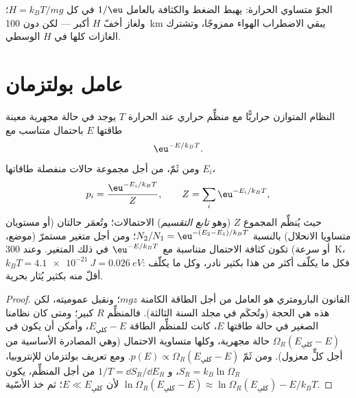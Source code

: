 \begin{omfigure}

{\small الجوّ متساوي الحرارة: يهبط الضغط والكثافة بالعامل $1/\eu$
في كل  $H = k_BT/mg$؛ ولغاز أخفّ $H$ أكبر
--- لكن دون \qty{100}{km} يبقي الاضطراب الهواء ممزوجًا، وتشترك
الغازات كلها في $H$ الوسطي.}
\end{omfigure}

\section{عامل بولتزمان}

\begin{theorem}\label{thm:b2:boltzmann-factor:factor}
النظام المتوازن حراريًّا مع منظِّم حراري عند الحرارة
$T$ يوجد في حالة مجهرية معينة طاقتها $E$ باحتمال
متناسب مع
\[
\eu^{-E/k_BT} .
\]
ومن ثَمّ، من أجل مجموعة حالات منفصلة طاقاتها $E_i$،
\[
p_i = \frac{\eu^{-E_i/k_BT}}{Z}, \qquad Z = \sum_i\eu^{-E_i/k_BT} ,
\]
حيث يُنظِّم المجموع $Z$ (وهو \emph{تابع التقسيم})
الاحتمالات؛ وتُعمَر حالتان (أو مستويان متساويا الانحلال)
بالنسبة $N_2/N_1 = \eu^{-(E_2 - E_1)/k_BT}$؛
ومن أجل متغير مستمرّ (موضع، أو سرعة) تكون كثافة
الاحتمال متناسبة مع $\eu^{-E/k_BT}$ في ذلك المتغير. وعند
\qty{300}{K}، $k_BT = \qty{4.1e-21}{J} = \qty{0.026}{eV}$: فكل ما
يكلّف أكثر من هذا بكثير نادر، وكل ما يكلّف أقلّ منه بكثير
يُثار بحرية.
\end{theorem}

\begin{proof}
القانون البارومتري هو العامل من أجل الطاقة الكامنة $mgz$؛ ونقبل
عموميته، لكن هذه هي الحجة (وتُحكَم في مجلد
السنة الثالثة). فالمنظِّم $R$ كبير؛ ومتى كان نظامنا الصغير في
حالة طاقتها $E$، كانت للمنظِّم الطاقة $E_{\text{كلي}} -
E$، وأمكن أن يكون في $\Omega_R(E_{\text{كلي}} - E)$ حالة مجهرية، وكلها
متساوية الاحتمال (وهي المصادرة الأساسية من أجل كلٍّ معزول). ومن ثَمّ
$p(E) \propto \Omega_R(E_{\text{كلي}} - E)$. ومع تعريف بولتزمان
للإنتروبيا، $S_R = k_B\ln\Omega_R$، و $1/T = \dd S_R/\dd E_R$ من أجل
المنظِّم، يكون $\ln\Omega_R(E_{\text{كلي}} - E) \approx \ln\Omega_R(E_{\text{كلي}})
- E/k_BT$ لأن $E \ll E_{\text{كلي}}$؛ ثم خذ الأسّية.
\end{proof}

